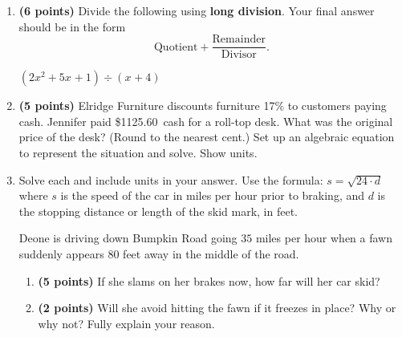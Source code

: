 \documentclass[12pt]{amsart}
\begin{document}
\begin{enumerate}
  
\vfill \vfill \vfill
\def \a{4}\def \b{2}\def \c{-3}\def \r{13}\def \monicpol{x^{}+4}\def \longnbad{2x^{2}+5x^{}+1}\def \anspol{2x^{}-3}
\item {\bf (6 points)} 
 Divide the following using {\bf long division}. Your final answer should be in the form $$ \text{Quotient} + \dfrac{\text{Remainder}}{\text{Divisor}}.$$

\vspace{3mm}

$(\longnbad) \div (\monicpol)$

\vfill  \vfill \vfill
\newpage\def \discount{17}\def \paid{1125.60}\def \rainy{9.70}\def \orcost{1356.14}\def \purcost{962.05}\def \orrainy{11.69}
\item {\bf (5 points)} 
 Elridge Furniture discounts furniture \discount\% to customers paying cash. Jennifer paid \$\paid\ cash for a roll-top desk. What was the original price of the desk? (Round to the nearest cent.) Set up an algebraic equation to represent the situation and solve. Show units.

\vfill 
\def \insvar{24}\def \d{80}\def \zerospeed{43.82}\def \slimit{35}\def \s{51}\def \skidd{108.375}\def \safed{51.042}\def \rsafed{51}

 
\item Solve each and include units in your answer. Use the formula: $s = \sqrt{\insvar \cdot d}$ where $s$ is the speed of the car in miles per hour prior to braking, and $d$ is the stopping distance or length of the skid mark, in feet. 

\vspace{3mm}

Deone is driving down Bumpkin Road going $\slimit$ miles per hour when a fawn suddenly appears $\d$ feet away in the middle of the road. \begin{enumerate}
\item {\bf (5 points)} If she slams on her brakes now, how far will her car skid? \vspace{4cm}
\item {\bf (2 points)} Will she avoid hitting the fawn if it freezes in place? Why or why not? Fully explain your reason. \vspace{3cm}
\end{enumerate}



\end{enumerate}
\end{document}
